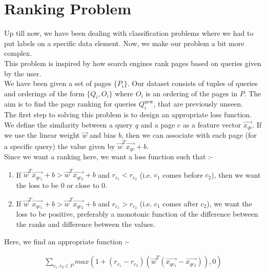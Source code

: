 \documentclass[12pt]{article}
\begin{document}
\section{Ranking Problem}

Up till now, we have been dealing with classification problems where we had to put labels on a specific data element. Now, we make our problem a bit more complex.\\

This problem is inspired by how search engines rank pages based on queries given by the user.\\

We have been given a set of pages $\{P_i\}$. Our dataset consists of tuples of queries and orderings of the form $\{Q_i,O_i\}$ where $O_i$ is an ordering of the pages in $P$. The aim is to find the page ranking for queries $Q^{\text{new}}_i$, that are previously unseen.\\

The first step to solving this problem is to design an appropriate loss function.\\

We define the similarity between a query $q$ and a page $c$ as a feature vector $\vec{x_{qc}}$. If we use the linear weight $\vec{w}$ and bias $b$, then we can associate with each page (for a specific query) the value given by $\vec{w}^{T} \vec{x_{qc}} +b$.\\

Since we want a ranking here, we want a loss function such that :-

\begin{enumerate}
    \item If $\vec{w}^{T} \vec{x_{qc_1}} +b>\vec{w}^{T} \vec{x_{qc_2}} +b$ and $r_{c_1}<r_{c_2}$ (i.e. $c_1$ comes before $c_2$), then we want the loss to be 0 or close to 0.
    \item If $\vec{w}^{T} \vec{x_{qc_1}} +b>\vec{w}^{T} \vec{x_{q{c_2}}} +b$ and $r_{c_1}>r_{c_2}$ (i.e. $c_1$ comes after $c_2$), we want the loss to be positive, preferably a monotonic function of the difference between the ranks and difference between the values.
\end{enumerate}

Here, we find an appropriate function :-

\begin{align*}
    \sum_{c_1,c_2 \in P} max(1+(r_{c_1}-r_{c_2})(\vec{w}^{T}(\vec{x_{qc_1}}-\vec{x_{qc_2}})),0)
\end{align*}
\end{document}
